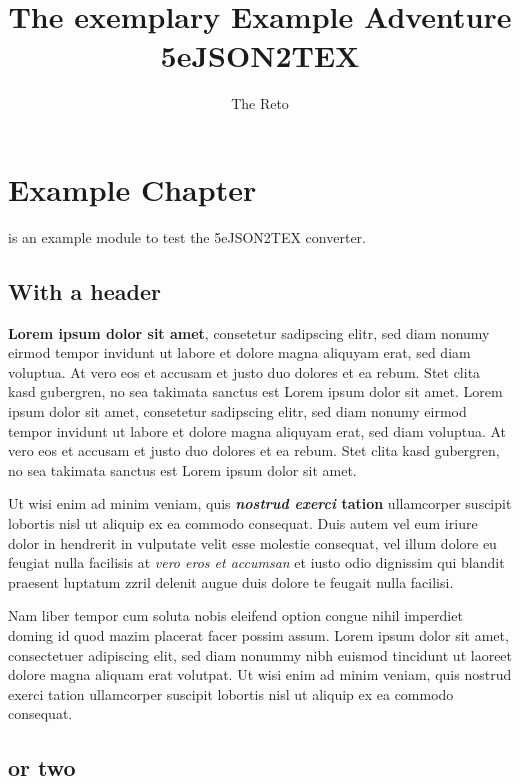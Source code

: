 \documentclass[10pt,twoside,twocolumn,openany,nodeprecatedcode]{dndbook}
\title{The exemplary Example Adventure \\ \large 5eJSON2TEX}
\author{The Reto}
\begin{document}
\maketitle
{}
\tableofcontents
\newpage
\chapter{Example Chapter}

 is an example module to test the 5eJSON2TEX converter.

\section{With a header}

\textbf{Lorem ipsum dolor sit amet}, consetetur sadipscing elitr, sed diam nonumy eirmod tempor invidunt ut labore et dolore magna aliquyam erat, sed diam voluptua. At vero eos et accusam et justo duo dolores et ea rebum. Stet clita kasd gubergren, no sea takimata sanctus est Lorem ipsum dolor sit amet. Lorem ipsum dolor sit amet, consetetur sadipscing elitr, sed diam nonumy eirmod tempor invidunt ut labore et dolore magna aliquyam erat, sed diam voluptua. At vero eos et accusam et justo duo dolores et ea rebum. Stet clita kasd gubergren, no sea takimata sanctus est Lorem ipsum dolor sit amet.

Ut wisi enim ad minim veniam, quis \textbf{\textit{nostrud exerci} tation} ullamcorper suscipit lobortis nisl ut aliquip ex ea commodo consequat. Duis autem vel eum iriure dolor in hendrerit in vulputate velit esse molestie consequat, vel illum dolore eu feugiat nulla facilisis at \textit{vero eros et accumsan} et iusto odio dignissim qui blandit praesent luptatum zzril delenit augue duis dolore te feugait nulla facilisi.

Nam liber tempor cum soluta nobis eleifend option congue nihil imperdiet doming id quod mazim placerat facer possim assum. Lorem ipsum dolor sit amet, consectetuer adipiscing elit, sed diam nonummy nibh euismod tincidunt ut laoreet dolore magna aliquam erat volutpat. Ut wisi enim ad minim veniam, quis nostrud exerci tation ullamcorper suscipit lobortis nisl ut aliquip ex ea commodo consequat.

\section{or two}
\end{document}

